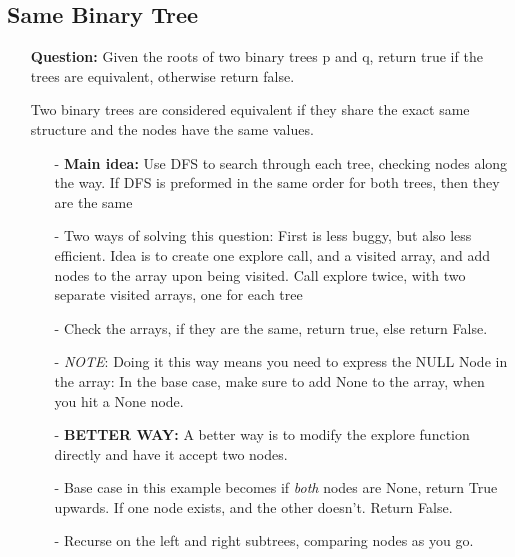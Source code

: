 \documentclass[12pt]{article}
\begin{document}
\subsection{Same Binary Tree}
\begin{enumerate}
  \item[] \textbf{Question:} Given the roots of two binary trees p and q, return true if the trees are equivalent, otherwise return false.

Two binary trees are considered equivalent if they share the exact same structure and the nodes have the same values.

    \begin{enumerate}
      \item[-] \textbf{Main idea:} Use DFS to search through each tree, checking nodes along the way. If DFS is preformed in the same order for both trees, then they are the same
      \item[-] Two ways of solving this question: First is less buggy, but also less efficient. Idea is to create one explore call, and a visited array, and add nodes to the array upon being visited. Call explore twice, with two separate visited arrays, one for each tree
      \item[-] Check the arrays, if they are the same, return true, else return False. 
      \item[-] \textit{NOTE}: Doing it this way means you need to express the NULL Node in the array: In the base case, make sure to add None to the array, when you hit a None node.
      \item[-] \textbf{BETTER WAY:} A better way is to modify the explore function directly and have it accept two nodes.
      \item[-] Base case in this example becomes if \textit{both} nodes are None, return True upwards. If one node exists, and the other doesn't. Return False. 
      \item[-] Recurse on the left and right subtrees, comparing nodes as you go.

    \end{enumerate}
\end{enumerate}
\end{document}
